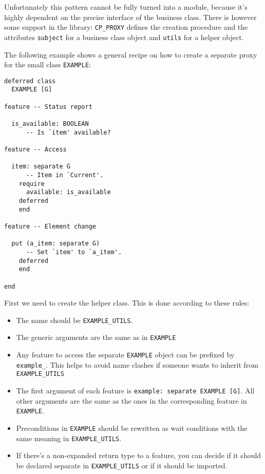 \documentclass[a4paper,10pt]{report}
\begin{document}
Unfortunately this pattern cannot be fully turned into a module, because it's highly dependent on the precise interface of the business class.
There is however some support in the library: 
\lstinline!CP_PROXY! defines the creation procedure and the attributes \lstinline!subject! for a business class object and \lstinline!utils! for a helper object.


The following example shows a general recipe on how to create a separate proxy for the small class \lstinline!EXAMPLE!:

\begin{lstlisting}
deferred class
  EXAMPLE [G]

feature -- Status report

  is_available: BOOLEAN
      -- Is `item' available?
  
feature -- Access

  item: separate G
      -- Item in `Current'.
    require
      available: is_available
    deferred
    end

feature -- Element change

  put (a_item: separate G)
      -- Set `item' to `a_item'.
    deferred
    end

end
\end{lstlisting}

First we need to create the helper class.
This is done according to these rules:
 \begin{itemize}
  \item The name should be \lstinline!EXAMPLE_UTILS!.
  \item The generic arguments are the same as in \lstinline!EXAMPLE!
  \item Any feature to access the separate \lstinline!EXAMPLE! object can be prefixed by \lstinline!example_!.
  This helps to avoid name clashes if someone wants to inherit from \lstinline!EXAMPLE_UTILS!
  \item The first argument of each feature is \lstinline!example: separate EXAMPLE [G]!.
  All other arguments are the same as the ones in the corresponding feature in \lstinline!EXAMPLE!.
  \item Preconditions in \lstinline!EXAMPLE! should be rewritten as wait conditions with the same meaning in \lstinline!EXAMPLE_UTILS!.
  \item If there's a non-expanded return type to a feature, you can decide if it should be declared separate in \lstinline!EXAMPLE_UTILS! or if it should be imported.
 \end{itemize}
\end{document}
